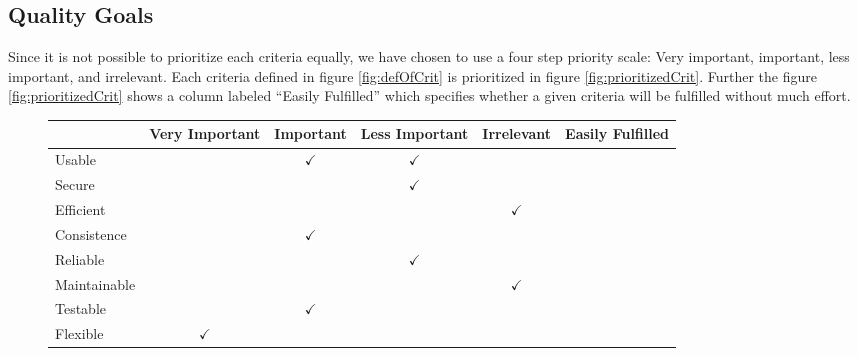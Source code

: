 \subsection{Quality Goals}
Since it is not possible to prioritize each criteria equally, we have chosen to use a four step priority scale: Very important, important, less important, and irrelevant.
Each criteria defined in figure \ref{fig:defOfCrit} is prioritized in figure \ref{fig:prioritizedCrit}.
Further the figure \ref{fig:prioritizedCrit} shows a column labeled ``Easily Fulfilled''
which specifies whether a given criteria will be fulfilled without much effort.

\begin{figure}[h]
	\centering
		\begin{tabular}{| l | m{} | m{}| m{}| m{}|m{}|} \hline
												& Very  Important 												& Important 														& Less Important 											& Irrelevant 												& Easily Fulfilled 									\\ \hline
		Usable  						& 																				& \multicolumn{1}{c|}{$\checkmark$}			& \multicolumn{1}{c|}{$\checkmark$}		& 																	& 																	\\ \hline
		Secure  						& 																				& 																			& \multicolumn{1}{c|}{$\checkmark$} 	& 																	& 																	\\ \hline
		Efficient 					& 																				& 																			& 																		& \multicolumn{1}{c|}{$\checkmark$} & 																	\\ \hline
		Consistence  				& 																				& \multicolumn{1}{c|}{$\checkmark$} 		& 																		& 																	& 																	\\ \hline
		Reliable  					& 																				& 																			& \multicolumn{1}{c|}{$\checkmark$} 	& 																	& 																	\\ \hline
		Maintainable  			& 																				& 																			& 																		& \multicolumn{1}{c|}{$\checkmark$} & 																	\\ \hline
		Testable  					& 																				& \multicolumn{1}{c|}{$\checkmark$} 		& 																		& 																	& 																	\\ \hline
		Flexible  					& \multicolumn{1}{c|}{$\checkmark$} 			& 																			& 																		& 																	& 																	\\ \hline

\end{tabular}
\end{figure}
